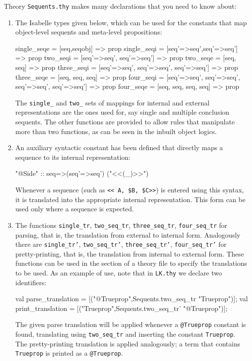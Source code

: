 Theory \texttt{Sequents.thy} makes many declarations that you need to know
about: 
\begin{enumerate}
\item The Isabelle types given below, which can be used for the
constants that map object-level sequents and meta-level propositions:
%
\begin{ttbox}
 single_seqe = [seq,seqobj] => prop
 single_seqi = [seq'=>seq',seq'=>seq'] => prop
 two_seqi    = [seq'=>seq', seq'=>seq'] => prop
 two_seqe    = [seq, seq] => prop
 three_seqi  = [seq'=>seq', seq'=>seq', seq'=>seq'] => prop
 three_seqe  = [seq, seq, seq] => prop
 four_seqi   = [seq'=>seq', seq'=>seq', seq'=>seq', seq'=>seq'] => prop
 four_seqe   = [seq, seq, seq, seq] => prop
\end{ttbox}

The \verb|single_| and \verb|two_| sets of mappings for internal and
external representations are the ones used for, say single and
multiple conclusion sequents. The other functions are provided to
allow rules that manipulate more than two functions, as can be seen in
the inbuilt object logics.

\item An auxiliary syntactic constant has been
defined that directly maps a sequence to its internal representation:
\begin{ttbox}
"@Side"  :: seq=>(seq'=>seq')     ("<<(_)>>")
\end{ttbox}
Whenever a sequence (such as \verb|<< A, $B, $C>>|) is entered using this
syntax, it is translated into the appropriate internal representation.  This
form can be used only where a sequence is expected.

\item The \ML{} functions \texttt{single\_tr}, \texttt{two\_seq\_tr},
  \texttt{three\_seq\_tr}, \texttt{four\_seq\_tr} for parsing, that is, the
  translation from external to internal form.  Analogously there are
  \texttt{single\_tr'}, \texttt{two\_seq\_tr'}, \texttt{three\_seq\_tr'},
  \texttt{four\_seq\_tr'} for pretty-printing, that is, the translation from
  internal to external form.  These functions can be used in the \ML{} section
  of a theory file to specify the translations to be used.  As an example of
  use, note that in {\tt LK.thy} we declare two identifiers:
\begin{ttbox}
val parse_translation =
    [("@Trueprop",Sequents.two_seq_tr "Trueprop")];
val print_translation =
    [("Trueprop",Sequents.two_seq_tr' "@Trueprop")];
\end{ttbox}
The given parse translation will be applied whenever a \verb|@Trueprop|
constant is found, translating using \verb|two_seq_tr| and inserting the
constant \verb|Trueprop|.  The pretty-printing translation is applied
analogously; a term that contains \verb|Trueprop| is printed as a
\verb|@Trueprop|.
\end{enumerate}



